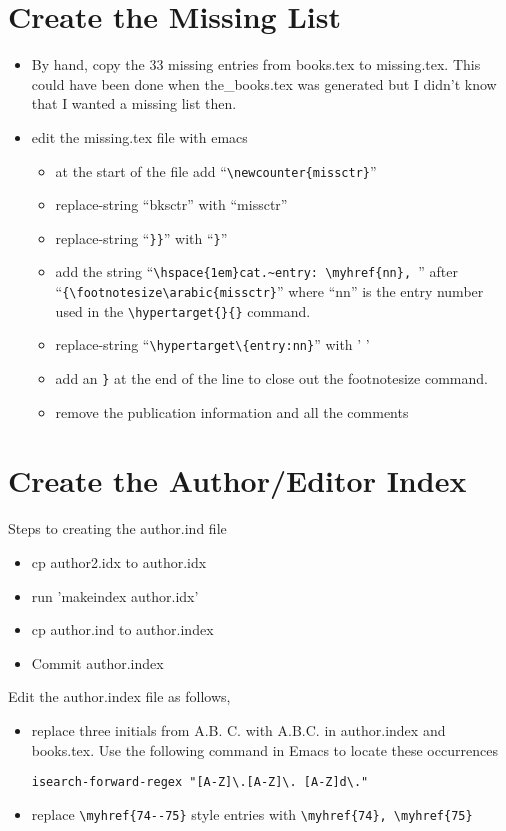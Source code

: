 \documentclass{article}
\begin{document}
\section{Create the Missing List}
\begin{itemize}
\item By hand, copy the 33 missing entries from books.tex to missing.tex.
  This could have been done when the\_books.tex was generated but I didn't
  know that I wanted a missing list then.
\item edit the missing.tex file with emacs
  \begin{itemize}
  \item at the start of the file add ``\verb|\newcounter{missctr}|''
  \item replace-string ``bksctr'' with ``missctr''
    \item replace-string ``\verb|}}|'' with ``\verb|}|''
  \item add the string ``\verb|\hspace{1em}cat.~entry: \myhref{nn}, |''
    after ``\verb|{\footnotesize\arabic{missctr}|'' where
    ``nn'' is the entry number used in the \verb|\hypertarget{}{}| command.
  \item replace-string ``\verb|\hypertarget\{entry:nn}|'' with ' '
    \item add an \verb|}| at the end of the line to close out the footnotesize command.
    \item remove the publication information and all the comments
  \end{itemize}
\end{itemize}


\section{Create the Author/Editor Index}
Steps to creating the author.ind file
\begin{itemize}
  \item cp author2.idx to author.idx
  \item run 'makeindex author.idx'
  \item cp author.ind to author.index
  \item Commit author.index
\end{itemize}
\noindent
Edit the author.index file as follows,
\begin{itemize}
  \item replace three initials from A.B. C. with A.B.C.
    in author.index and books.tex.  Use the following command in Emacs
    to locate these occurrences
   
   \verb|isearch-forward-regex "[A-Z]\.[A-Z]\. [A-Z]d\."|

 \item replace \verb|\myhref{74--75}| style entries
   with \verb|\myhref{74}, \myhref{75}|
\end{itemize}

\end{document}
